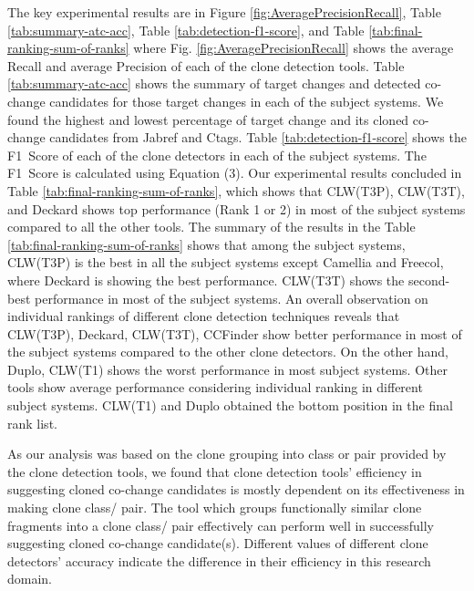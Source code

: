 \documentclass[review]{elsarticle}
\begin{document}
The key experimental results are in Figure \ref{fig:AveragePrecisionRecall}, Table \ref{tab:summary-atc-acc}, Table \ref{tab:detection-f1-score}, and Table \ref{tab:final-ranking-sum-of-ranks} where Fig. \ref{fig:AveragePrecisionRecall} shows the average Recall and average Precision of each of the clone detection tools. Table \ref{tab:summary-atc-acc} shows the summary of target changes and detected co-change candidates for those target changes in each of the subject systems.  We found the highest and lowest percentage of target change and its cloned co-change candidates from Jabref and Ctags. Table \ref{tab:detection-f1-score} shows the F1~Score of each of the clone detectors in each of the subject systems. The F1~Score is calculated using Equation (3). Our experimental results concluded in Table \ref{tab:final-ranking-sum-of-ranks}, which shows that CLW(T3P), CLW(T3T), and Deckard shows top performance (Rank 1 or 2) in most of the subject systems compared to all the other tools. The summary of the results in the Table \ref{tab:final-ranking-sum-of-ranks} shows that among the subject systems, CLW(T3P) is the best in all the subject systems except Camellia and Freecol, where Deckard is showing the best performance. CLW(T3T) shows the second-best performance in most of the subject systems. An overall observation on individual rankings of different clone detection techniques reveals that CLW(T3P), Deckard, CLW(T3T), CCFinder show better performance in most of the subject systems compared to the other clone detectors. On the other hand, Duplo, CLW(T1) shows the worst performance in most subject systems. Other tools show average performance considering individual ranking in different subject systems.  CLW(T1) and Duplo obtained the bottom position in the final rank list. 

As our analysis was based on the clone grouping into class or pair provided by the clone detection tools, we found that clone detection tools' efficiency in suggesting cloned co-change candidates is mostly dependent on its effectiveness in making clone class/ pair. The tool which groups functionally similar clone fragments into a clone class/ pair effectively can perform well in successfully suggesting cloned co-change candidate(s). Different values of different clone detectors' accuracy indicate the difference in their efficiency in this research domain. 
\end{document}
